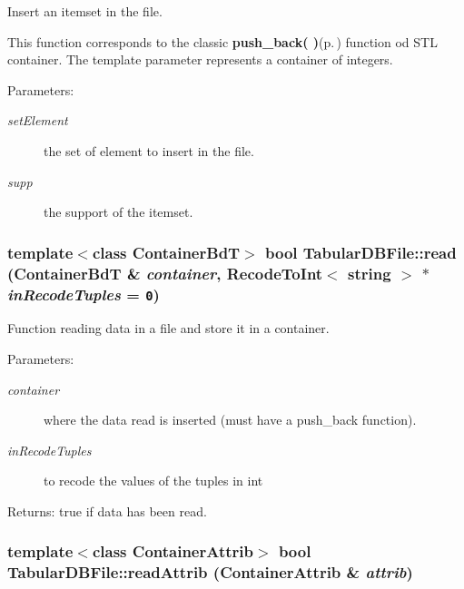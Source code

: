 Insert an itemset in the file. 

This function corresponds to the classic {\bf push\_\-back( )}{\rm (p.\,\pageref{class_tabular_d_b_file_548d79f25d83bd10f9dbfbf542d22b1a})} function od STL container. The template parameter represents a container of integers. \begin{Desc}
\item[Parameters:]
\begin{description}
\item[{\em set\-Element}]the set of element to insert in the file. \item[{\em supp}]the support of the itemset. \end{description}
\end{Desc}
\subsubsection{\setlength{\rightskip}{0pt plus 5cm}template$<$class Container\-Bd\-T$>$ bool Tabular\-DBFile::read (Container\-Bd\-T \& {\em container}, {\bf Recode\-To\-Int}$<$ string $>$ $\ast$ {\em in\-Recode\-Tuples} = {\tt 0})\hspace{0.3cm}{\tt  [protected]}}\label{class_tabular_d_b_file_2767edf34b755fb5c3fc672dfdde32f7}


Function reading data in a file and store it in a container. 

\begin{Desc}
\item[Parameters:]
\begin{description}
\item[{\em container}]where the data read is inserted (must have a push\_\-back function). \item[{\em in\-Recode\-Tuples}]to recode the values of the tuples in int \end{description}
\end{Desc}
\begin{Desc}
\item[Returns:]true if data has been read. \end{Desc}
\subsubsection{\setlength{\rightskip}{0pt plus 5cm}template$<$class Container\-Attrib$>$ bool Tabular\-DBFile::read\-Attrib (Container\-Attrib \& {\em attrib})\hspace{0.3cm}{\tt  [protected]}}\label{class_tabular_d_b_file_455cbe09d821a2c4b71766e5338653bd}


